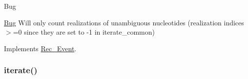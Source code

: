\begin{DoxyRefDesc}{Bug}
\item[\hyperlink{bug__bug000002}{Bug}]Will only count realizations of unambiguous nucleotides (realization indices$>$=0 since they are set to -\/1 in iterate\+\_\+common) \end{DoxyRefDesc}


Implements \hyperlink{classRec__Event}{Rec\+\_\+\+Event}.

\mbox{\label{classDinucl__markov_ace49d0da113be7d77ad0d4c3b8152c3d}} 
\subsubsection{\texorpdfstring{iterate()}{iterate()}}
